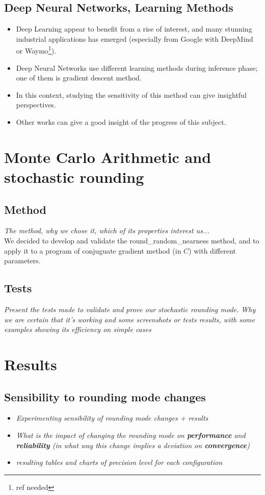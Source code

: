 \documentclass[a4paper,11pt]{article}
\let\cite=\supercite
\begin{document}
\subsection{Deep Neural Networks, Learning Methods}
\begin{itemize}
   \item Deep Learning appear to benefit from a rise of interest, and many stunning industrial applications has emerged (especially from Google with DeepMind or Waymo\footnote{ref needed}).
   \item Deep Neural Networks use different learning methods during inference phase; one of them is gradient descent method.
   \item In this context, studying the sensitivity of this method can give insightful perspectives. %
   \item Other works can give a good insight of the progress of this subject\cite{Gupta2015}\cite{Courbariaux2014}.
 \end{itemize} 


\section{Monte Carlo Arithmetic and stochastic rounding} %
\subsection{Method}
\emph{The method, why we chose it, which of its properties interest us...}
\\We decided to develop and validate the {\ttfamily round\_random\_nearness} method, and to apply it to a program of conjuguate gradient method (in $C$) with different parameters. %
\subsection{Tests}
\emph{Present the tests made to validate and prove our stochastic rounding mode. Why we are certain that it's working and some screenshots or tests results, with some examples showing its efficiency on simple cases}

\section{Results}
\subsection{Sensibility to rounding mode changes}
\begin{itemize}
  \item \emph{Experimenting sensibility of rounding mode changes + results }
  \item \emph{What is the impact of changing the rounding mode on \textbf{performance} and \textbf{reliability} (in what way this change implies a deviation on \textbf{convergence}) }
  \item \emph{resulting tables and charts of precision level for each configuration}
\end{itemize}
\end{document}
